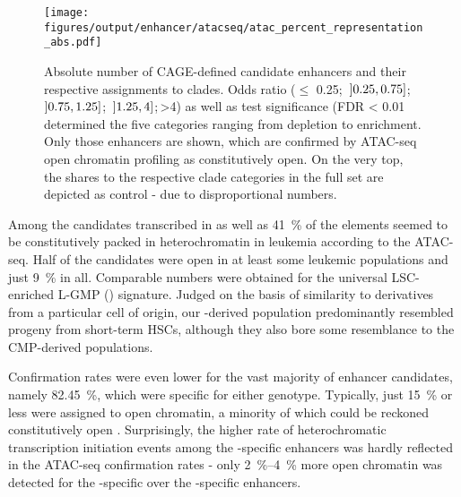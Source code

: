  \begin{figure}[!bt]
 	\texttt{[image: figures/output/enhancer/atacseq/atac\_percent\_representation\_abs.pdf]}
 	\caption{Absolute number of CAGE-defined candidate enhancers and their respective assignments to clades. Odds ratio ($\leq$ \num{0.25};\, \ensuremath{\interval[open left]{0.25}{0.75}};\, \ensuremath{\interval[open left]{0.75}{1.25}};\, \ensuremath{\interval[open left]{1.25}{4}};\,>\num{4}) as well as test significance (FDR < \num{0.01} determined the five categories ranging from depletion to enrichment. Only those enhancers are shown, which are confirmed by ATAC-seq open chromatin profiling as constitutively open. On the very top, the shares to the respective clade categories in the full set are depicted as control - due to disproportional numbers.}
 	\label{fig:enhancers:trowbridge_atac_percent_representation_abs}
 \end{figure}

Among the candidates transcribed in \dnmtwt as well as \dnmtchip \SI{41}{\percent} of the elements seemed to be constitutively packed in heterochromatin in \mllafnine leukemia according to the ATAC-seq. Half of the candidates were open in at least some leukemic populations and just \SI{9}{\percent} in all. Comparable numbers were obtained for the universal \kithi LSC-enriched L-GMP (\lgmp) signature. Judged on the basis of similarity to derivatives from a particular cell of origin, our \lsk-derived \kithi population predominantly resembled progeny from short-term HSCs, although they also bore some resemblance to the CMP-derived populations. 

Confirmation rates were even lower for the vast majority of enhancer candidates, namely \SI{82.45}{\percent}, which were specific for either genotype. Typically, just \SI{15}{\percent} or less were assigned to open chromatin, a minority of which could be reckoned constitutively open . Surprisingly, the higher rate of heterochromatic transcription initiation events among the \dnmtwt-specific enhancers was hardly reflected in the ATAC-seq confirmation rates - only \SIrange{2}{4}{\percent} more open chromatin was detected for the \dnmtchip-specific over the \dnmtwt-specific enhancers.
 
